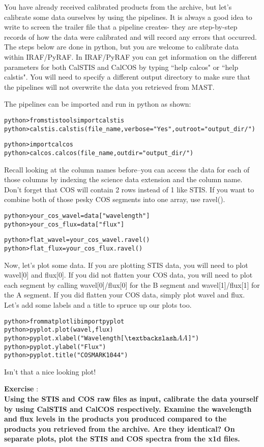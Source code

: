 You have already received calibrated products from the archive, but let's calibrate some data ourselves by using the pipelines.  It is always a good idea to write to screen the trailer file that a pipeline creates- they are step-by-step records of how the data were calibrated and will record any errors that occurred. The steps below are done in python, but you are welcome to calibrate data within IRAF/PyRAF. In IRAF/PyRAF you can get information on the different parameters for both CalSTIS and CalCOS by typing ``help calcos" or ``help calstis". You will need to specify a different output directory to make sure that the pipelines will not overwrite the data you retrieved from MAST.

The pipelines can be imported and run in python as shown:
\begin{alltt}
python> from stistools import calstis
python> calstis.calstis(file_name, verbose = "Yes", outroot="output_dir/")

python> import calcos
python> calcos.calcos(file_name, outdir="output_dir/")
\end{alltt}

Recall looking at the column names before--you can access the data for each of those columns by indexing the science data extension and the column name. Don't forget that COS will contain 2 rows instead of 1 like STIS. If you want to combine both of those pesky COS segments into one array, use ravel(). 
\begin{alltt}
python> your_cos_wavel = data["wavelength"]
python> your_cos_flux = data["flux"]

python> flat_wavel = your_cos_wavel.ravel()
python> flat_flux = your_cos_flux.ravel()
\end{alltt}
Now, let's plot some data. If you are plotting STIS data, you will need to plot wavel[0] and flux[0]. If you did not flatten your COS data, you will need to plot each segment by calling wavel[0]/flux[0] for the B segment and wavel[1]/flux[1] for the A segment. If you did flatten your COS data, simply plot wavel and flux. Let's add some labels and a title to spruce up our plots too.
\begin{alltt}
python> from matplotlib import pyplot
python> pyplot.plot(wavel, flux)
python> pyplot.xlabel("Wavelength [$\textbackslash AA$]")
python> pyplot.ylabel("Flux")
python> pyplot.title("COS MARK1044")
\end{alltt}
Isn't that a nice looking plot!

{\bf \color{blue} Exercise  }:  \\
{\bf Using the STIS and COS raw files as input, calibrate the data yourself by using CalSTIS and CalCOS respectively. Examine the wavelength and flux levels in the products you produced compared to the products you retrieved from the archive. Are they identical? On separate plots, plot the STIS and COS spectra from the x1d files.}

